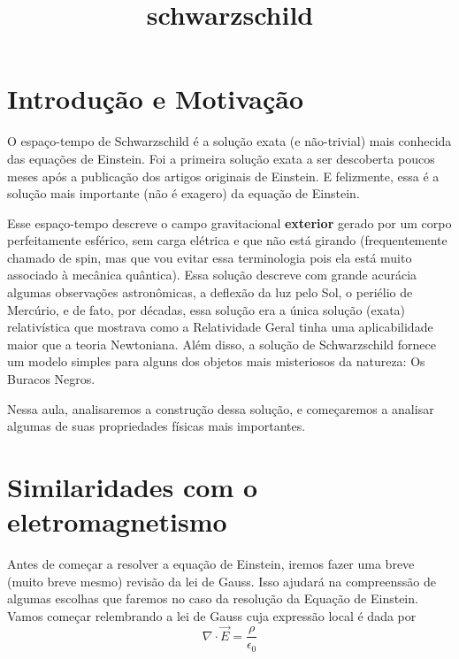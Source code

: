 \documentclass[11pt]{article}
\title{schwarzschild}
\begin{document}
    

    
    

    
    \hypertarget{introduuxe7uxe3o-e-motivauxe7uxe3o}{%
\section{Introdução e
Motivação}\label{introduuxe7uxe3o-e-motivauxe7uxe3o}}

    O espaço-tempo de Schwarzschild é a solução exata (e não-trivial) mais
conhecida das equações de Einstein. Foi a primeira solução exata a ser
descoberta poucos meses após a publicação dos artigos originais de
Einstein. E felizmente, essa é a solução mais importante (não é exagero)
da equação de Einstein.

Esse espaço-tempo descreve o campo gravitacional \textbf{exterior}
gerado por um corpo perfeitamente esférico, sem carga elétrica e que não
está girando (frequentemente chamado de spin, mas que vou evitar essa
terminologia pois ela está muito associado à mecânica quântica). Essa
solução descreve com grande acurácia algumas observações astronômicas, a
deflexão da luz pelo Sol, o periélio de Mercúrio, e de fato, por
décadas, essa solução era a única solução (exata) relativística que
mostrava como a Relatividade Geral tinha uma aplicabilidade maior que a
teoria Newtoniana. Além disso, a solução de Schwarzschild fornece um
modelo simples para alguns dos objetos mais misteriosos da natureza: Os
Buracos Negros.

Nessa aula, analisaremos a construção dessa solução, e começaremos a
analisar algumas de suas propriedades físicas mais importantes.

    \hypertarget{similaridades-com-o-eletromagnetismo}{%
\section{Similaridades com o
eletromagnetismo}\label{similaridades-com-o-eletromagnetismo}}

    Antes de começar a resolver a equação de Einstein, iremos fazer uma
breve (muito breve mesmo) revisão da lei de Gauss. Isso ajudará na
compreenssão de algumas escolhas que faremos no caso da resolução da
Equação de Einstein. Vamos começar relembrando a lei de Gauss cuja
expressão local é dada por
\[ \tag{2.1} \nabla \cdot \vec{E} = \frac{\rho}{\epsilon_0}\]
\end{document}
